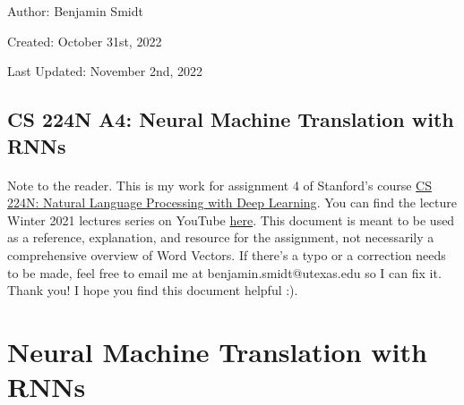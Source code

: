 \documentclass[12pt]{article}
\begin{document}
\noindent Author: Benjamin Smidt

\noindent Created: October 31st, 2022

\noindent Last Updated: November 2nd, 2022
\begin{center}
\section*{CS 224N A4: Neural Machine Translation with RNNs}
\end{center}

\paragraph{} Note to the reader. This is my work for assignment 4 of Stanford's course
\href{https://web.stanford.edu/class/cs224n/}{CS 224N: Natural Language Processing with Deep Learning}. 
You can find the lecture Winter 2021 lectures series on YouTube 
\href{https://www.youtube.com/playlist?list=PLoROMvodv4rOSH4v6133s9LFPRHjEmbmJ}{here}.
This document is meant to be used as a reference, explanation, and resource for the assignment, 
not necessarily a comprehensive overview of Word Vectors. If there's a typo or a correction 
needs to be made, feel free to email me at benjamin.smidt@utexas.edu so I can fix it. 
Thank you! I hope you find this document helpful :). 

\tableofcontents{}

\newpage

\section{Neural Machine Translation with RNNs}
\end{document}
